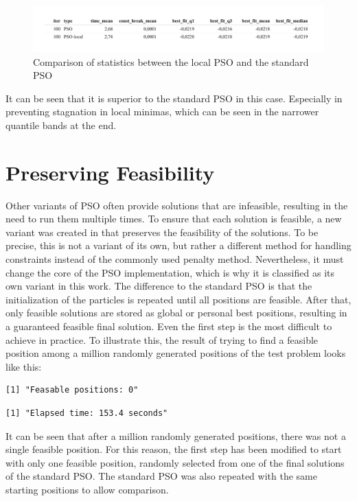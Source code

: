 \documentclass[
  oneside, a4paper, 12pt, openany]{book}
\theoremstyle{definition}
\theoremstyle{definition}
\theoremstyle{definition}
\theoremstyle{definition}
\theoremstyle{remark}
\begin{document}
\begin{figure}[H]
\includegraphics{Master_Thesis_files/figure-latex/variants6-1} \caption{Comparison of statistics between the local PSO and the standard PSO}\label{fig:variants6}
\end{figure}

It can be seen that it is superior to the standard PSO in this case. Especially in preventing stagnation in local minimas, which can be seen in the narrower quantile bands at the end.

\hypertarget{preserving-feasibility}{%
\section{Preserving Feasibility}\label{preserving-feasibility}}

Other variants of PSO often provide solutions that are infeasible, resulting in the need to run them multiple times. To ensure that each solution is feasible, a new variant was created in \citep{XiEb2002} that preserves the feasibility of the solutions. To be precise, this is not a variant of its own, but rather a different method for handling constraints instead of the commonly used penalty method. Nevertheless, it must change the core of the PSO implementation, which is why it is classified as its own variant in this work. The difference to the standard PSO is that the initialization of the particles is repeated until all positions are feasible. After that, only feasible solutions are stored as global or personal best positions, resulting in a guaranteed feasible final solution. Even the first step is the most difficult to achieve in practice. To illustrate this, the result of trying to find a feasible position among a million randomly generated positions of the test problem looks like this:

\begin{verbatim}
[1] "Feasable positions: 0"
\end{verbatim}

\begin{verbatim}
[1] "Elapsed time: 153.4 seconds"
\end{verbatim}

It can be seen that after a million randomly generated positions, there was not a single feasible position. For this reason, the first step has been modified to start with only one feasible position, randomly selected from one of the final solutions of the standard PSO. The standard PSO was also repeated with the same starting positions to allow comparison.
\end{document}
